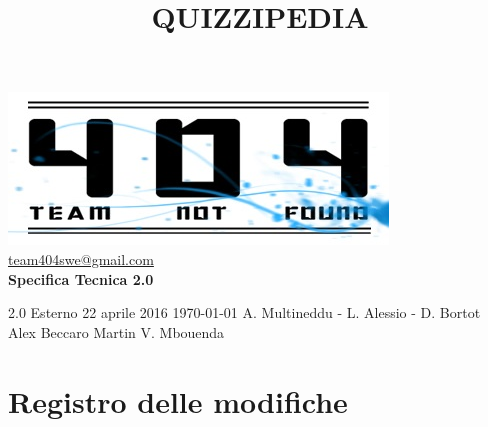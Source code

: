 \documentclass[a4paper,11pt]{article}
\title{\textbf{{\fontsize{8mm}{5mm}\selectfont QUIZZIPEDIA}}}
\date{}
\author{}
\begin{document}
	\maketitle
	\thispagestyle{empty}
	\begin{center}	
	\includegraphics{../team_not_found.jpg}\\
	\fontsize{5mm}{3mm}\url{team404swe@gmail.com}\\
	
	\vspace{50mm}
	\textbf{Specifica Tecnica 2.0}
	\end{center}
			{2.0} 							%
			{Esterno} 						%
			{22 aprile 2016} 				%
			{\today} 						%
			{A. Multineddu - L. Alessio - D. Bortot}	%
			{Alex Beccaro } 			%
			{Martin V. Mbouenda} 				%
	\newpage
	\thispagestyle{empty}
	\null  

	\newpage
	\newpage
	\fancyfoot[R]{\thepage}
	
	\hspace{30 mm}
	\section*{Registro delle modifiche}
	
	\beginregistro
	
\end{document}
